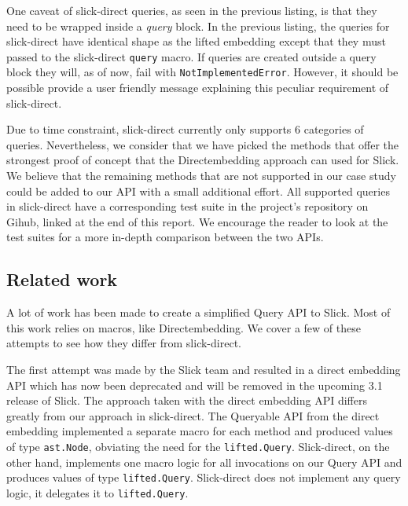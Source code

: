 One caveat of slick-direct queries, as seen in the previous listing, is that they need to be wrapped inside a \emph{query} block.
In the previous listing, the queries for slick-direct have identical shape as the lifted embedding except that they must passed to the slick-direct \texttt{query} macro.
If queries are created outside a query block they will, as of now, fail with \texttt{NotImplementedError}.
However, it should be possible provide a user friendly message explaining this peculiar requirement of slick-direct.

Due to time constraint, slick-direct currently only supports 6 categories of queries.
Nevertheless, we consider that we have picked the methods that offer the strongest proof of concept that the Directembedding approach can used for Slick.
We believe that the remaining methods that are not supported in our case study could be added to our API with a small additional effort.
All supported queries in slick-direct have a corresponding test suite in the project's repository on Gihub, linked at the end of this report.
We encourage the reader to look at the test suites for a more in-depth comparison between the two APIs.



\subsection{Related work} %
\label{sub:Relatedwork}
A lot of work has been made to create a simplified Query API to Slick.
Most of this work relies on macros, like Directembedding.
We cover a few of these attempts to see how they differ from slick-direct.

\begin{sloppypar}
The first attempt was made by the Slick team and resulted in a direct embedding API which has now been deprecated and will be removed in the upcoming 3.1 release of Slick.
The approach taken with the direct embedding API differs greatly from our approach in slick-direct.
The Queryable API from the direct embedding implemented a separate macro for each method and produced values of type \texttt{ast.Node}, obviating the need for the \texttt{lifted.Query}.
Slick-direct, on the other hand, implements one macro logic for all invocations on our Query API and produces values of type \texttt{lifted.Query}.
Slick-direct does not implement any query logic, it delegates it to \texttt{lifted.Query}.
\end{sloppypar}

